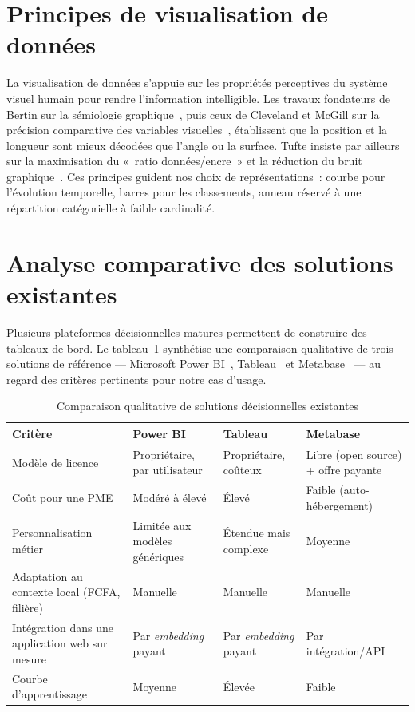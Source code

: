 \documentclass[11pt,a4paper]{report}
\begin{document}
\section{Principes de visualisation de données}
La visualisation de données s'appuie sur les propriétés perceptives du système
visuel humain pour rendre l'information intelligible. Les travaux fondateurs de
Bertin sur la sémiologie graphique~\cite{bertin1967semiologie}, puis ceux de
Cleveland et McGill sur la précision comparative des variables
visuelles~\cite{cleveland1984graphical}, établissent que la position et la
longueur sont mieux décodées que l'angle ou la surface. Tufte insiste par
ailleurs sur la maximisation du «~ratio données/encre~» et la réduction du bruit
graphique~\cite{tufte2001visual}. Ces principes guident nos choix de
représentations~: courbe pour l'évolution temporelle, barres pour les
classements, anneau réservé à une répartition catégorielle à faible cardinalité.

\section{Analyse comparative des solutions existantes}
Plusieurs plateformes décisionnelles matures permettent de construire des
tableaux de bord. Le tableau~\ref{tab:comparatif} synthétise une comparaison
qualitative de trois solutions de référence — Microsoft Power
BI~\cite{powerbi}, Tableau~\cite{tableau} et Metabase~\cite{metabase} — au
regard des critères pertinents pour notre cas d'usage.

\begin{table}[H]
\centering
\caption{Comparaison qualitative de solutions décisionnelles existantes}
\label{tab:comparatif}
\renewcommand{\arraystretch}{1.3}
\begin{tabularx}{\textwidth}{@{}l X X X@{}}
\toprule
\textbf{Critère} & \textbf{Power BI} & \textbf{Tableau} & \textbf{Metabase}\\
\midrule
Modèle de licence & Propriétaire, par utilisateur & Propriétaire, coûteux & Libre (open source) + offre payante\\
Coût pour une PME & Modéré à élevé & Élevé & Faible (auto-hébergement)\\
Personnalisation métier & Limitée aux modèles génériques & Étendue mais complexe & Moyenne\\
Adaptation au contexte local (FCFA, filière) & Manuelle & Manuelle & Manuelle\\
Intégration dans une application web sur mesure & Par \emph{embedding} payant & Par \emph{embedding} payant & Par intégration/API\\
Courbe d'apprentissage & Moyenne & Élevée & Faible\\
\bottomrule
\end{tabularx}
\end{table}
\end{document}
